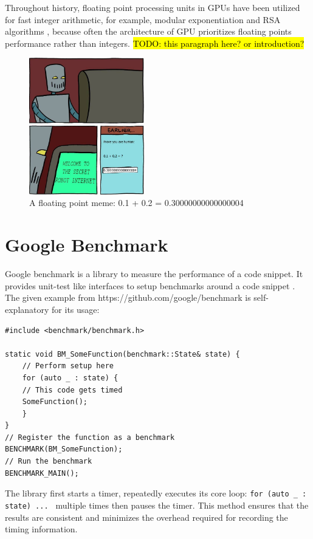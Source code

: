 \documentclass[logo,bsc,singlespacing,parskip]{infthesis}
\begin{document}
Throughout history, floating point processing units in GPUs have been utilized
for fast integer arithmetic, for example, modular exponentiation
\cite{intfpu-modexp} and RSA algorithms \cite{intfpu-rsa}, because often the
architecture of GPU prioritizes floating points performance rather than
integers. 
\hl{TODO: this paragraph here? or introduction?}


\begin{figure}
\begin{center}
    \includegraphics[width=50mm,scale=0.1]{image/0.3004.jpg}
    \caption{A floating point meme: 0.1 + 0.2 = 0.30000000000000004}
    \label{meme}
\end{center}
\end{figure}

\section{Google Benchmark}
Google benchmark is a library to measure the performance of a code snippet. It
provides unit-test like interfaces to setup benchmarks around a code snippet
\cite{googlebench}. The given example from https://github.com/google/benchmark
is self-explanatory for its usage: 

\begin{verbatim}
#include <benchmark/benchmark.h>

static void BM_SomeFunction(benchmark::State& state) {
    // Perform setup here
    for (auto _ : state) {
    // This code gets timed
    SomeFunction();
    }
}
// Register the function as a benchmark
BENCHMARK(BM_SomeFunction);
// Run the benchmark
BENCHMARK_MAIN();
\end{verbatim}

The library first starts a timer, repeatedly executes its core loop: \texttt{for
(auto \_ : state) ... } multiple times then pauses the timer. This method
ensures that the results are consistent and minimizes the overhead required for
recording the timing information. 
\end{document}

